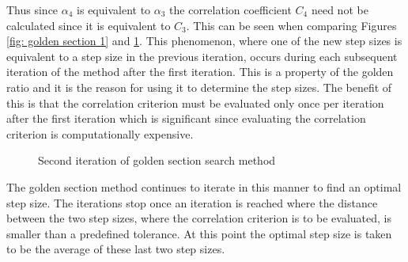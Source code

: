 \documentclass[12pt,oneside,openany,a4paper, %
english, %
masters-t, goldenblock]{usthesis}
\begin{document}
Thus since $\alpha_4$ is equivalent to $\alpha_3$ the correlation coefficient $C_4$ need not be calculated since it is equivalent to $C_3$. This can be seen when comparing Figures \ref{fig: golden section 1} and \ref{fig: golden section 2}. This phenomenon, where one of the new step sizes is equivalent to a step size in the previous iteration, occurs during each subsequent iteration of the method after the first iteration. This is a property of the golden ratio and it is the reason for using it to determine the step sizes. The benefit of this is that the correlation criterion must be evaluated only once per iteration after the first iteration which is significant since evaluating the correlation criterion is computationally expensive.

\begin{figure}[H]
\caption{Second iteration of golden section search method}
\label{fig: golden section 2}
\end{figure}
The golden section method continues to iterate in this manner to find an optimal step size. The iterations stop once an iteration is reached where the distance between the two step sizes, where the correlation criterion is to be evaluated, is smaller than a predefined tolerance. At this point the optimal step size is taken to be the average of these last two step sizes.
\end{document}
